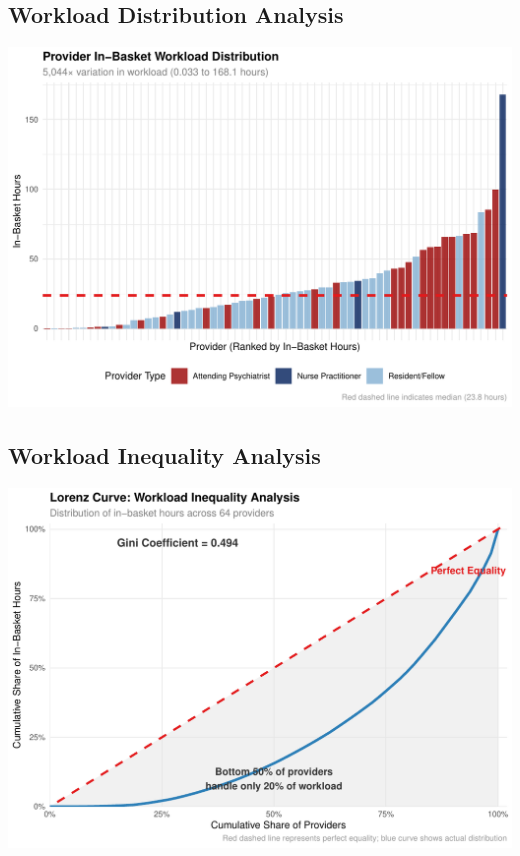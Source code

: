 \documentclass[
  11pt,
]{article}
\begin{document}
\subsection{Workload Distribution
Analysis}\label{workload-distribution-analysis}

\begin{center}
\includegraphics[width=1\textwidth,height=\textheight]{comprehensive-analysis-report_files/figure-pdf/workload-distribution-1.pdf}
\end{center}

\subsection{Workload Inequality
Analysis}\label{workload-inequality-analysis}

\begin{center}
\includegraphics[width=1\textwidth,height=\textheight]{comprehensive-analysis-report_files/figure-pdf/lorenz-curve-1.pdf}
\end{center}
\end{document}
